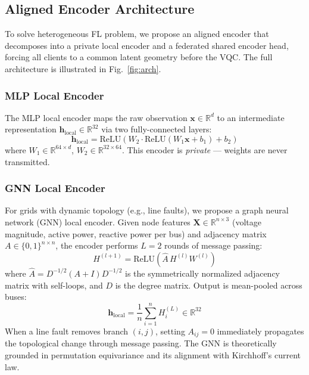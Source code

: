 \documentclass[journal]{IEEEtran}
\begin{document}
\subsection{Aligned Encoder Architecture}

To solve heterogeneous FL problem, we propose an aligned encoder that decomposes into
a private local encoder and a federated shared encoder head,
forcing all clients to a common latent geometry before the VQC.
The full architecture is illustrated in Fig.~\ref{fig:arch}.

\subsubsection{MLP Local Encoder}

The MLP local encoder maps the raw observation
$\mathbf{x} \in \mathbb{R}^{d}$ to an intermediate representation
$\mathbf{h}_{\text{local}} \in \mathbb{R}^{32}$ via two fully-connected layers:
%
\begin{equation}
    \mathbf{h}_{\text{local}} =
    \text{ReLU}\!\left(W_2 \cdot \text{ReLU}(W_1\mathbf{x} + b_1) + b_2\right)
\end{equation}
%
where $W_1 \in \mathbb{R}^{64 \times d}$, $W_2 \in \mathbb{R}^{32 \times 64}$.
This encoder is \textit{private} --- weights are never transmitted.

\subsubsection{GNN Local Encoder}

For grids with dynamic topology (e.g., line faults), we propose a
graph neural network (GNN) local encoder. Given node features
$\mathbf{X} \in \mathbb{R}^{n \times 3}$ (voltage magnitude, active
power, reactive power per bus) and adjacency matrix
$A \in \{0,1\}^{n \times n}$, the encoder performs $L=2$ rounds of
message passing:
%
\begin{equation}
    H^{(l+1)} = \text{ReLU}\!\left(\hat{A}\, H^{(l)} W^{(l)}\right)
\end{equation}
%
where $\hat{A} = D^{-1/2}(A+I)D^{-1/2}$ is the symmetrically normalized
adjacency matrix with self-loops, and $D$ is the degree matrix.
Output is mean-pooled across buses:
%
\begin{equation}
    \mathbf{h}_{\text{local}} =
    \frac{1}{n}\sum_{i=1}^{n} H^{(L)}_i \in \mathbb{R}^{32}
\end{equation}
%
When a line fault removes branch $(i,j)$, setting $A_{ij}=0$ immediately
propagates the topological change through message passing.
The GNN is theoretically grounded in permutation equivariance
\cite{kipf2017gcn} and its alignment with Kirchhoff's current law.
\end{document}
